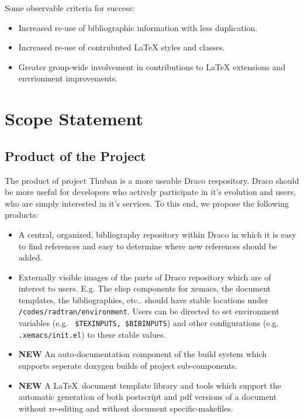 \documentclass[11pt]{ResearchNote}
\begin{document}
Some observable criteria for success:

\begin{itemize}
\item Increased re-use of bibliographic information with less
  duplication.
\item Increased re-use of contrubuted LaTeX styles and classes.
\item Greater group-wide involvement in contributions to LaTeX
  extensions and envrionment improvements.
\end{itemize}

\section*{Scope Statement}


\subsection*{Product of the Project}

The product of project Thuban is a more useable {\sf Draco}
respository.  {\sf Draco} should be more useful for developers who
actively participate in it's evolution and users, who are simply
interested in it's services.  To this end, we propose the following
products:

\begin{itemize}
  \item A central, organized, bibliography repository within {\sf Draco} in
    which it is easy to find references and easy to determine where
    new references should be added.
  \item Externally visible images of the parts of {\sf Draco} repository
    which are of interest to users. E.g. The elisp components for
    xemacs, the document templates, the bibliographies, etc.. should
    have stable locations under {\tt /codes/radtran/environment}.
    Users can be directed to set environment variables (e.g. {\tt
      \$TEXINPUTS, \$BIBINPUTS}) and other configurations (e.g. {\tt
      .xemacs/init.el}) to these stable values.
  \item {\bf NEW} An auto-documentation component of the build system
    which supports seperate doxygen builds of project sub-components.
  \item {\bf NEW} A \LaTeX\ document template library and tools which
    support the automatic generation of both postscript and pdf
    versions of a document without re-editing and without document
    specific-makefiles.
\end{itemize}
\end{document}
